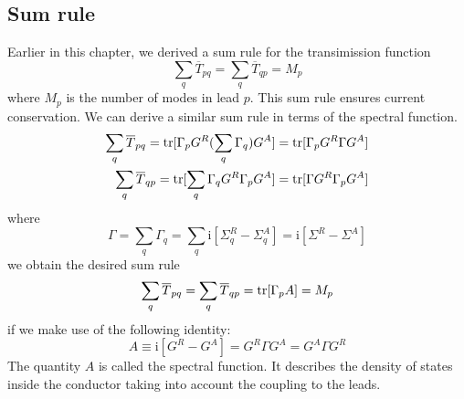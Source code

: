 \documentclass[11pt,a4paper]{book}
\theoremstyle{plain}
\theoremstyle{definition}
\theoremstyle{remark}
\newcommand{\ii}{\mathrm{i}}                      %
\begin{document}
\subsection{Sum rule}
Earlier in this chapter, we derived a sum rule for the transimission function
\begin{equation}
    \sum_q \overline{T}_{pq} = \sum_q \overline{T}_{qp} = M_p
\end{equation}
where $M_p$ is the number of modes in lead $p$. This sum rule ensures current conservation. We can derive a similar sum rule in terms of the spectral function.
\begin{equation}
    \begin{aligned}
       \sum_q \overline{T}_{pq} = \trace[\Gamma_p G^R (\sum_q \Gamma_q) G^A] = \trace[\Gamma_p G^R \Gamma G^A] \\
       \sum_q \overline{T}_{qp} = \trace[\sum_q \Gamma_q G^R \Gamma_p G^A] = \trace[\Gamma G^R \Gamma_p G^A]
    \end{aligned}
\end{equation}
where
\begin{equation}
    \Gamma = \sum_q \Gamma_q = \sum_q \ii [\Sigma^R_q - \Sigma^A_q] = \ii [\Sigma^R - \Sigma^A]
\end{equation}
we obtain the desired sum rule
\begin{equation}
    \sum_q \overline{T}_{pq} = \sum_q \overline{T}_{qp} = \trace[\Gamma_p A] = M_p
\end{equation}
if we make use of the following identity:
\begin{equation}
    A \equiv \ii [G^R - G^A] = G^R \Gamma G^A = G^A \Gamma G^R
\end{equation}
    The quantity $A$ is called the spectral function. It describes the density of states inside the conductor taking into account the coupling to the leads.
\end{document}

